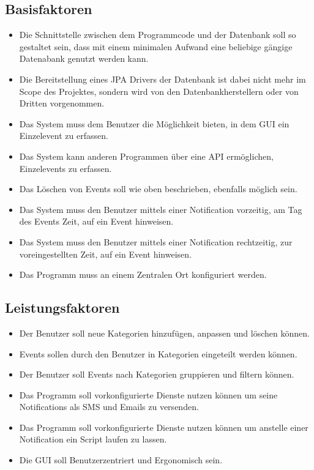 \documentclass[11pt,titelpage]{scrartcl}
\begin{document}
\subsection{Basisfaktoren}
\begin{itemize}

\item Die Schnittstelle zwischen dem Programmcode und der Datenbank soll so gestaltet sein, dass mit einem minimalen Aufwand eine beliebige gängige Datenabank genutzt werden kann.


\item
Die Bereitstellung eines JPA Drivers der Datenbank ist dabei nicht mehr im Scope des Projektes, sondern wird von den Datenbankherstellern oder von Dritten vorgenommen.

\item
Das System muss dem Benutzer die Möglichkeit bieten, in dem GUI ein Einzelevent zu erfassen.


\item
Das System kann anderen Programmen über eine API ermöglichen, Einzelevents zu erfassen.

\item
Das Löschen von Events soll wie oben beschrieben, ebenfalls möglich sein.


\item
Das System muss den Benutzer mittels einer Notification vorzeitig, am Tag des  Events Zeit, auf ein Event hinweisen.
\item
Das System muss den Benutzer mittels einer Notification rechtzeitig, zur voreingestellten Zeit, auf ein Event hinweisen.

\item
Das Programm muss an einem Zentralen Ort konfiguriert werden.

\end{itemize}

\subsection{Leistungsfaktoren}
\begin{itemize}
\item
Der Benutzer soll neue Kategorien hinzufügen, anpassen und löschen können.
\item
Events sollen durch den Benutzer in Kategorien eingeteilt werden können.
\item
Der Benutzer soll Events nach Kategorien gruppieren und filtern können.
\item
Das Programm soll vorkonfigurierte Dienste nutzen können um seine Notifications als SMS und Emails zu versenden.
\item
Das Programm soll vorkonfigurierte Dienste nutzen können um anstelle einer Notification ein Script laufen zu lassen.
\item
Die GUI soll Benutzerzentriert und Ergonomisch sein.
\end{itemize}
\end{document}
